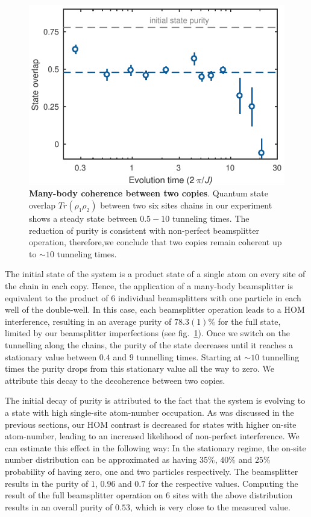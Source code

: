 \begin{figure}[t]
	\centering
	\includegraphics[scale=1]{figures/CBH_MBP_single_trace.pdf}
	\caption{{\bf Many-body coherence between two copies}. Quantum state overlap $Tr(\rho_1 \rho_2) $ between two six sites chains in our experiment shows a steady state between $0.5-10$ tunneling times. The reduction of purity is consistent with non-perfect beamsplitter operation, therefore,we conclude that two copies remain coherent up to $\sim10$ tunneling times. }
	\label{fig:CBH_MBP_vs_time}
\end{figure}

The initial state of the system is a product state of a single atom on every site of the chain in each copy. Hence, the application of a many-body beamsplitter is equivalent to the product of $6$ individual beamsplitters with one particle in each well of the double-well. In this case, each beamsplitter operation leads to a HOM interference, resulting in an average purity of $78.3(1)\%$ for the full state, limited by our beamsplitter imperfections (see fig.~\ref{fig:CBH_MBP_vs_time}). Once we switch on the tunnelling along the chains, the purity of the state decreases until it reaches a stationary value between $0.4$ and $ 9$ tunnelling times. Starting at $\sim 10$ tunnelling times the purity drops from this stationary value all the way to zero. We attribute this decay to the decoherence between two copies.

The initial decay of purity is attributed to the fact that the system is evolving to a state with high single-site atom-number occupation. As was discussed in the previous sections, our HOM contrast is decreased for states with higher on-site atom-number, leading to an increased likelihood of non-perfect interference. We can estimate this effect in the following way: In the stationary regime, the on-site number distribution can be approximated as having $35\%$, $40\%$ and $25\%$ probability of having zero, one and two particles respectively. The beamsplitter results in the purity of $1$, $0.96$ and $0.7$ for the respective values. Computing the result of the full beamsplitter operation on $6$ sites with the above distribution results in an overall purity of $0.53$, which is very close to the measured value.

